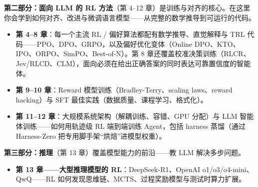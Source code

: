 \documentclass[11pt,a4paper,openany]{book}
\begin{document}
\textbf{第二部分：面向 LLM 的 RL 方法}（第 4--12 章）是训练与对齐的核心。在这里你会学到如何对齐、改进与微调语言模型——从完整的数学推导到可运行的代码。

\begin{itemize}
  \item \textbf{第 4--8 章}：每一个主流 RL / 偏好算法都配有数学推导、直觉解释与 TRL 代码——PPO、DPO、GRPO，以及偏好优化变体（Online DPO、KTO、IPO、ORPO、SimPO、Best-of-N）。第 8 章还覆盖校准决策训练（RLCR、Jev/RLCD、CLM），面向必须在给出正确答案的同时表达可靠置信度的智能体。
  \item \textbf{第 9--10 章}：Reward 模型训练（Bradley-Terry、scaling laws、reward hacking）与 SFT 最佳实践（数据质量、课程学习、格式化）。
  \item \textbf{第 11--12 章}：大规模系统架构（解耦训练、容错、GPU 分配）与 LLM 智能体训练——如何用轨迹级 RL 端到端训练 Agent，包括 harness 蒸馏（通过 Harness-Zero 把专用脚手架“烘焙”进模型权重）。
\end{itemize}

\textbf{第三部分：推理}（第 13 章）覆盖模型能力的前沿——教 LLM 解决多步问题。

\begin{itemize}
  \item \textbf{第 13 章——大型推理模型的 RL}：DeepSeek-R1、OpenAI o1/o3/o4-mini、QwQ——RL 如何发现思维链、MCTS、过程奖励模型与测试时算力扩展。
\end{itemize}
\end{document}
